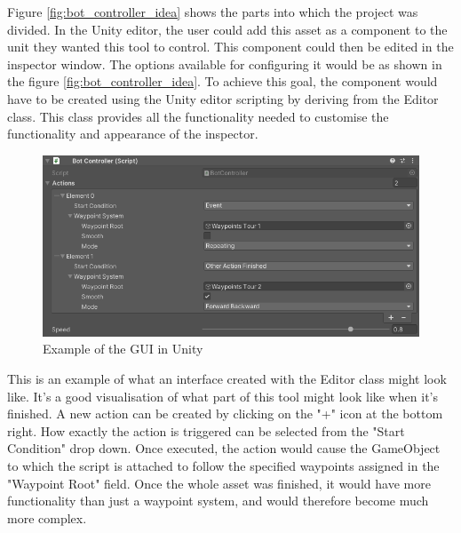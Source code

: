 Figure \ref{fig:bot_controller_idea} shows the parts into which the project was divided. In the Unity editor, the user could add this asset as a component to the unit they wanted this tool to control. This component could then be edited in the inspector window. The options available for configuring it would be as shown in the figure \ref{fig:bot_controller_idea}. To achieve this goal, the component would have to be created using the Unity editor scripting by deriving from the Editor class. This class provides all the functionality needed to customise the functionality and appearance of the inspector.

\begin{figure}[H]
	\centering
		\includegraphics[scale=0.6]{images/bot_controller_gui.png}
	\caption{Example of the GUI in Unity}
	\label{fig:bot_controller_gui}
\end{figure}

This is an example of what an interface created with the Editor class might look like. It's a good visualisation of what part of this tool might look like when it's finished. A new action can be created by clicking on the "+" icon at the bottom right. How exactly the action is triggered can be selected from the "Start Condition" drop down. Once executed, the action would cause the GameObject to which the script is attached to follow the specified waypoints assigned in the "Waypoint Root" field. Once the whole asset was finished, it would have more functionality than just a waypoint system, and would therefore become much more complex.

